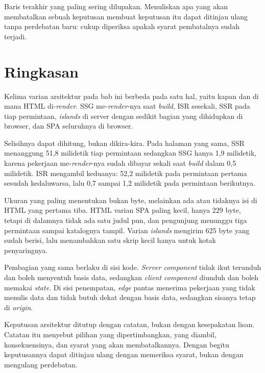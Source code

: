 Baris terakhir yang paling sering dilupakan. Menuliskan apa yang akan
membatalkan sebuah keputusan membuat keputusan itu dapat ditinjau ulang tanpa
perdebatan baru: cukup diperiksa apakah syarat pembatalnya sudah terjadi.

\section{Ringkasan}

Kelima varian arsitektur pada bab ini berbeda pada satu hal, yaitu kapan dan
di mana HTML di-\textit{render}. SSG me-\textit{render}-nya saat \textit{build}, ISR sesekali, SSR
pada tiap permintaan, \textit{islands} di server dengan sedikit bagian yang
dihidupkan di browser, dan SPA seluruhnya di browser.

Selisihnya dapat dihitung, bukan dikira-kira. Pada halaman yang sama, SSR
menanggung 51,8 milidetik tiap permintaan sedangkan SSG hanya 1,9 milidetik,
karena pekerjaan me-\textit{render}-nya sudah dibayar sekali saat \textit{build} dalam
0,5 milidetik. ISR mengambil keduanya: 52,2 milidetik pada permintaan
pertama sesudah kedaluwarsa, lalu 0,7 sampai 1,2 milidetik pada permintaan
berikutnya.

Ukuran yang paling menentukan bukan byte, melainkan ada atau tidaknya isi di
HTML yang pertama tiba. HTML varian SPA paling kecil, hanya 229 byte, tetapi
di dalamnya tidak ada satu judul pun, dan pengunjung menunggu tiga permintaan
sampai katalognya tampil. Varian \textit{islands} mengirim 625 byte yang
sudah berisi, lalu menambahkan satu skrip kecil hanya untuk kotak
penyaringnya.

Pembagian yang sama berlaku di sisi kode. \textit{Server component} tidak
ikut terunduh dan boleh menyentuh basis data, sedangkan \textit{client
component} diunduh dan boleh memakai \textit{state}. Di sisi penempatan,
\textit{edge} pantas menerima pekerjaan yang tidak menulis data dan tidak
butuh dekat dengan basis data, sedangkan sisanya tetap di \textit{origin}.

Keputusan arsitektur ditutup dengan catatan, bukan dengan kesepakatan lisan.
Catatan itu menyebut pilihan yang dipertimbangkan, yang diambil,
konsekuensinya, dan syarat yang akan membatalkannya. Dengan begitu
keputusannya dapat ditinjau ulang dengan memeriksa syarat, bukan dengan
mengulang perdebatan.
